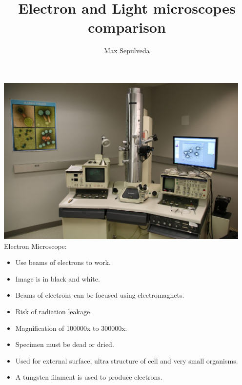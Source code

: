\documentclass[a0paper,fleqn]{betterposter}
\begin{document}
{{\includegraphics[width=5in]{electron} Electron Microscope:\\
\begin{itemize}
\item Use beams of electrons to work.
\item Image is in black and white.
\item Beams of electrons can be focused using electromagnets.
\item Risk of radiation leakage.
\item Magnification of 100000x to 300000x.
\item Specimen must be dead or dried.
\item Used for external surface, ultra structure of cell and very small organisms. 
\item A tungsten filament is used to produce electrons.
\end{itemize}


}{




}

}{

\title{Electron and Light microscopes comparison}
\author{Max Sepulveda}

}
\end{document}
